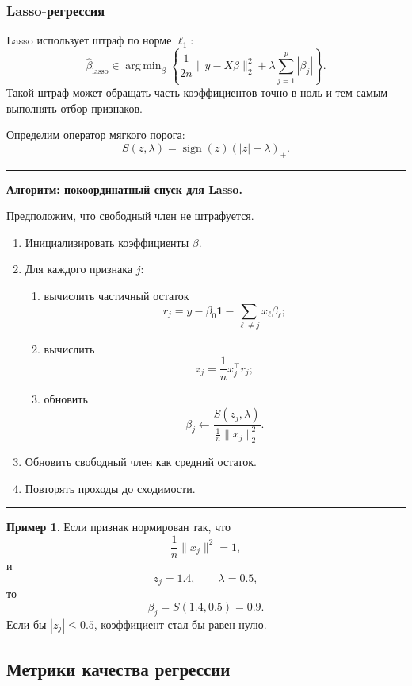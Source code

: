 \documentclass[12pt,a4paper]{article}
\theoremstyle{definition}
\newtheorem{example}[theorem]{Пример}
\theoremstyle{remark}
\newcommand{\sign}{\operatorname{sign}}
\newcommand{\Ind}{\mathbf{1}}
\DeclareMathOperator*{\argmin}{arg\,min}
\newenvironment{algorithmbox}[1]
{
    \begin{center}
    \begin{minipage}{0.96\textwidth}
    \hrule
    \medskip
    \textbf{Алгоритм: #1.}
    \par\smallskip
}
{
    \medskip
    \hrule
    \end{minipage}
    \end{center}
}
\begin{document}
\subsubsection{Lasso-регрессия}

Lasso использует штраф по норме $\ell_1$:
\[
    \widehat\beta_{\mathrm{lasso}}
    \in
    \argmin_{\beta}
    \left\{
        \frac{1}{2n}\|y-X\beta\|_2^2
        +
        \lambda\sum_{j=1}^{p}|\beta_j|
    \right\}.
\]
Такой штраф может обращать часть коэффициентов точно в ноль и тем самым
выполнять отбор признаков.

Определим оператор мягкого порога:
\[
    S(z,\lambda)
    =
    \sign(z)(|z|-\lambda)_+.
\]

\begin{algorithmbox}{покоординатный спуск для Lasso}
Предположим, что свободный член не штрафуется.
\begin{enumerate}
    \item Инициализировать коэффициенты $\beta$.
    \item Для каждого признака $j$:
    \begin{enumerate}
        \item вычислить частичный остаток
              \[
                  r_j
                  =
                  y-\beta_0\Ind-\sum_{\ell\ne j}x_\ell\beta_\ell;
              \]
        \item вычислить
              \[
                  z_j=\frac{1}{n}x_j^\top r_j;
              \]
        \item обновить
              \[
                  \beta_j
                  \leftarrow
                  \frac{
                      S(z_j,\lambda)
                  }{
                      \frac{1}{n}\|x_j\|_2^2
                  }.
              \]
    \end{enumerate}
    \item Обновить свободный член как средний остаток.
    \item Повторять проходы до сходимости.
\end{enumerate}
\end{algorithmbox}

\begin{example}
Если признак нормирован так, что
\[
    \frac{1}{n}\|x_j\|^2=1,
\]
и
\[
    z_j=1.4,\qquad \lambda=0.5,
\]
то
\[
    \beta_j
    =
    S(1.4,0.5)
    =
    0.9.
\]
Если бы $|z_j|\leq 0.5$, коэффициент стал бы равен нулю.
\end{example}

\subsection{Метрики качества регрессии}
\end{document}
